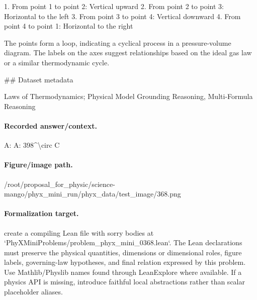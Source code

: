 1. From point 1 to point 2: Vertical upward
2. From point 2 to point 3: Horizontal to the left
3. From point 3 to point 4: Vertical downward
4. From point 4 to point 1: Horizontal to the right

The points form a loop, indicating a cyclical process in a pressure-volume diagram. The labels on the axes suggest relationships based on the ideal gas law or a similar thermodynamic cycle.

\#\# Dataset metadata

Laws of Thermodynamics; Physical Model Grounding Reasoning, Multi-Formula Reasoning

\paragraph{Recorded answer/context.}
A: A: 398\textasciicircum{}\textbackslash{}circ C

\paragraph{Figure/image path.}
/root/proposal\_for\_physic/science-mango/phyx\_mini\_run/phyx\_data/test\_image/368.png

\paragraph{Formalization target.}
create a compiling Lean file with sorry bodies at `PhyXMiniProblems/problem\_phyx\_mini\_0368.lean`. The Lean declarations must preserve the physical quantities, dimensions or dimensional roles, figure labels, governing-law hypotheses, and final relation expressed by this problem.
Use Mathlib/Physlib names found through LeanExplore where available. If a physics API is missing, introduce faithful local abstractions rather than scalar placeholder aliases.

